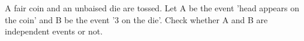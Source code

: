 \begin{flushleft}
A fair coin and an unbaised die are tossed. Let A be the event 'head appears on the coin' and B be the event '3 on the die'. Check whether A and B are independent events or not.
\end{flushleft}